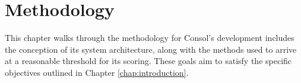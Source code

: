 
\chapter{Methodology}
\label{chap:methodology}


This chapter walks through the methodology for Consol's development includes the conception of its system architecture, along with the methods used to arrive at a reasonable threshold for its scoring. These goals aim to satisfy the specific objectives outlined in Chapter \ref{chap:introduction}. 

